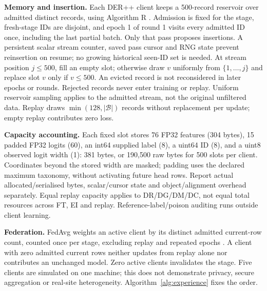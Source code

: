 \documentclass[10pt,a4paper]{article}
\begin{document}
\textbf{Memory and insertion.} Each DER++ client keeps a 500-record reservoir over admitted distinct records, using Algorithm R \cite{vitter}. Admission is fixed for the stage, fresh-stage IDs are disjoint, and epoch 1 of round 1 visits every admitted ID once, including the last partial batch. Only that pass proposes insertions. A persistent scalar stream counter, saved pass cursor and RNG state prevent reinsertion on resume; no growing historical seen-ID set is needed. At stream position $j\le500$, fill an empty slot; otherwise draw $v$ uniformly from $\{1,\ldots,j\}$ and replace slot $v$ only if $v\le500$. An evicted record is not reconsidered in later epochs or rounds. Rejected records never enter training or replay. Uniform reservoir sampling applies to the admitted stream, not the original unfiltered data. Replay draws $\min(128,|\mathcal B|)$ records without replacement per update; empty replay contributes zero loss.

\textbf{Capacity accounting.} Each fixed slot stores 76 FP32 features (304 bytes), 15 padded FP32 logits (60), an int64 supplied label (8), a uint64 ID (8), and a uint8 observed logit width (1): 381 bytes, or 190,500 raw bytes for 500 slots per client. Coordinates beyond the stored width are masked; padding uses the declared maximum taxonomy, without activating future head rows. Report actual allocated/serialised bytes, scalar/cursor state and object/alignment overhead separately. Equal replay capacity applies to DR/DG/DM/DC, not equal total resources across FT, EI and replay. Reference-label/poison auditing runs outside client learning.

\textbf{Federation.} FedAvg weights an active client by its distinct admitted current-row count, counted once per stage, excluding replay and repeated epochs \cite{fedavg}. A client with zero admitted current rows neither updates from replay alone nor contributes an unchanged model. Zero active clients invalidates the stage. Five clients are simulated on one machine; this does not demonstrate privacy, secure aggregation or real-site heterogeneity. Algorithm~\ref{alg:experience} fixes the order.
\end{document}
